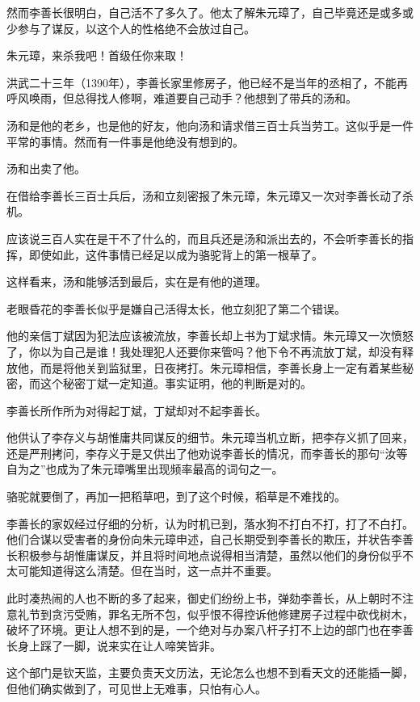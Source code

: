 \begin{multicols}{\theparacolNo}
		然而李善长很明白，自己活不了多久了。他太了解朱元璋了，自己毕竟还是或多或少参与了谋反，以这个人的性格绝不会放过自己。

		朱元璋，来杀我吧！首级任你来取！

		洪武二十三年（1390年），李善长家里修房子，他已经不是当年的丞相了，不能再呼风唤雨，但总得找人修啊，难道要自己动手？他想到了带兵的汤和。

		汤和是他的老乡，也是他的好友，他向汤和请求借三百士兵当劳工。这似乎是一件平常的事情。然而有一件事是他绝没有想到的。

		汤和出卖了他。

		在借给李善长三百士兵后，汤和立刻密报了朱元璋，朱元璋又一次对李善长动了杀机。

		应该说三百人实在是干不了什么的，而且兵还是汤和派出去的，不会听李善长的指挥，即使如此，这件事情已经足以成为骆驼背上的第一根草了。

		这样看来，汤和能够活到最后，实在是有他的道理。

		老眼昏花的李善长似乎是嫌自己活得太长，他立刻犯了第二个错误。

		他的亲信丁斌因为犯法应该被流放，李善长却上书为丁斌求情。朱元璋又一次愤怒了，你以为自己是谁！我处理犯人还要你来管吗？他下令不再流放丁斌，却没有释放他，而是将他关到监狱里，日夜拷打。朱元璋相信，李善长身上一定有着某些秘密，而这个秘密丁斌一定知道。事实证明，他的判断是对的。

		李善长所作所为对得起丁斌，丁斌却对不起李善长。

		他供认了李存义与胡惟庸共同谋反的细节。朱元璋当机立断，把李存义抓了回来，还是严刑拷问，李存义于是又供出了他劝说李善长的情况，而李善长的那句“汝等自为之”也成为了朱元璋嘴里出现频率最高的词句之一。

		骆驼就要倒了，再加一把稻草吧，到了这个时候，稻草是不难找的。

		李善长的家奴经过仔细的分析，认为时机已到，落水狗不打白不打，打了不白打。他们合谋以受害者的身份向朱元璋申述，自己长期受到李善长的欺压，并状告李善长积极参与胡惟庸谋反，并且将时间地点说得相当清楚，虽然以他们的身份似乎不太可能知道得这么清楚。但在当时，这一点并不重要。

		此时凑热闹的人也不断的多了起来，御史们纷纷上书，弹劾李善长，从上朝时不注意礼节到贪污受贿，罪名无所不包，似乎恨不得控诉他修建房子过程中砍伐树木，破坏了环境。更让人想不到的是，一个绝对与办案八杆子打不上边的部门也在李善长身上踩了一脚，说来实在让人啼笑皆非。

		这个部门是钦天监，主要负责天文历法，无论怎么也想不到看天文的还能插一脚，但他们确实做到了，可见世上无难事，只怕有心人。


\end{multicols}
